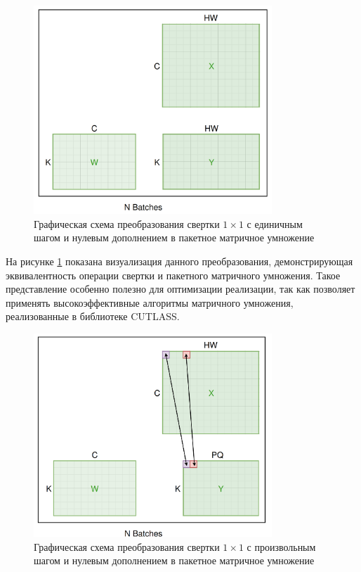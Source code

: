 \begin{figure}[h]
    \centering
    \includegraphics[width=0.8\textwidth]{src/images/1x1s0.png}
    \caption{Графическая схема преобразования свертки $1 \times 1$ с единичным шагом и нулевым дополнением в пакетное матричное умножение}
    \label{fig:1x1s0}
\end{figure}

На рисунке \ref{fig:1x1s0} показана визуализация данного преобразования, демонстрирующая эквивалентность операции свертки и пакетного матричного умножения.
Такое представление особенно полезно для оптимизации реализации, так как позволяет применять высокоэффективные алгоритмы матричного умножения, реализованные
в библиотеке CUTLASS.

\begin{figure}[h]
    \centering
    \includegraphics[width=0.8\textwidth]{src/images/1x1sn.png}
    \caption{Графическая схема преобразования свертки $1 \times 1$ с произвольным шагом и нулевым дополнением в пакетное матричное умножение}
    \label{fig:1x1sn}
\end{figure}

